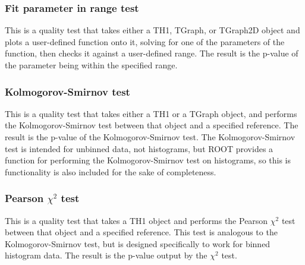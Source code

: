 \subsubsection{Fit parameter in range test}
This is a quality test that takes either a TH1, TGraph, or TGraph2D object and plots a user-defined function onto it, solving for one of the parameters of the function, then checks it against a user-defined range. The result is the p-value of the parameter being within the specified range.

\subsubsection{Kolmogorov-Smirnov test}
This is a quality test that takes either a TH1 or a TGraph object, and performs the Kolmogorov-Smirnov test between that object and a specified reference. The result is the p-value of the Kolmogorov-Smirnov test. The Kolmogorov-Smirnov test is intended for unbinned data, not histograms, but ROOT provides a function for performing the Kolmogorov-Smirnov test on histograms, so this is functionality is also included for the sake of completeness.

\subsubsection{Pearson $\chi^2$ test} %
This is a quality test that takes a TH1 object and performs the Pearson $\chi^2$ test between that object and a specified reference. This test is analogous to the Kolmogorov-Smirnov test, but is designed specifically to work for binned histogram data. The result is the p-value output by the $\chi^2$ test. 

